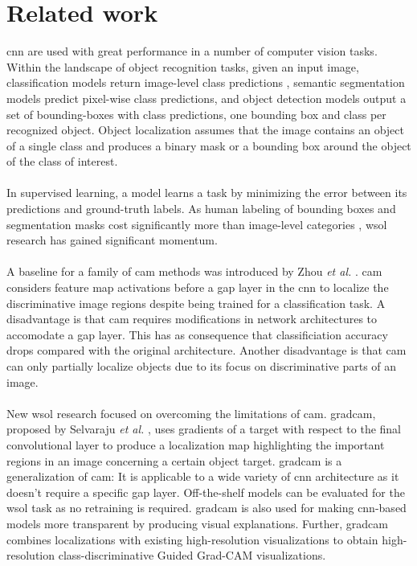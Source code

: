 \chapter{Related work} \label{ch:related_work}

\acrfull{cnn} are used with great performance in a number of computer vision tasks. Within the landscape of object recognition tasks, given an input image, classification models return image-level class predictions \cite{lecun1998gradient}, semantic segmentation models \cite{shelhamer2017fully} predict pixel-wise class predictions, and object detection models \cite{girshick2014rich, girshick2015fast, ren2015faster} output a set of bounding-boxes with class predictions, one bounding box and class per recognized object. Object localization \cite{russakovsky2015imagenet} assumes that the image contains an object of a single class and produces a binary mask or a bounding box around the object of the class of interest.
\\\\
In supervised learning, a model learns a task by minimizing the error between its predictions and ground-truth labels. As human labeling of bounding boxes and segmentation masks cost significantly more than image-level categories \cite{papandreou2015weakly}, \acrshort{wsol} research \cite{zhou2016cvpr, zhang2018adversarial, zhang2018self, choe2019attention, singh2017hide} has gained significant momentum. 
\\\\
A baseline for a family of \acrshort{cam} methods was introduced by Zhou \textit{et al.} \cite{zhou2016cvpr}. \acrfull{cam} considers feature map activations before a \acrfull{gap} layer in the \acrshort{cnn} to localize the discriminative image regions despite being trained for a classification task. A disadvantage is that \acrshort{cam} requires modifications in network architectures to accomodate a \acrshort{gap} layer. This has as consequence that classificiation accuracy drops compared with the original architecture. Another disadvantage is that \acrshort{cam} can only partially localize objects due to its focus on discriminative parts of an image. 
\\\\
New \acrshort{wsol} research focused on overcoming the limitations of \acrshort{cam}. \acrfull{gradcam}, proposed by Selvaraju \textit{et al.} \cite{selvaraju2017grad}, uses gradients of a target with respect to the final convolutional layer to produce a localization map highlighting the important regions in an image concerning a certain object target. \acrshort{gradcam} is a generalization of \acrshort{cam}: It is applicable to a wide variety of \acrshort{cnn} architecture as it doesn't require a specific \acrshort{gap} layer. Off-the-shelf models can be evaluated for the \acrshort{wsol} task as no retraining is required. \acrshort{gradcam} is also used for making \acrshort{cnn}-based models more transparent by producing visual explanations. Further, \acrshort{gradcam} combines localizations with existing high-resolution visualizations \cite{springenberg2014striving} to obtain high-resolution class-discriminative Guided Grad-CAM visualizations.
